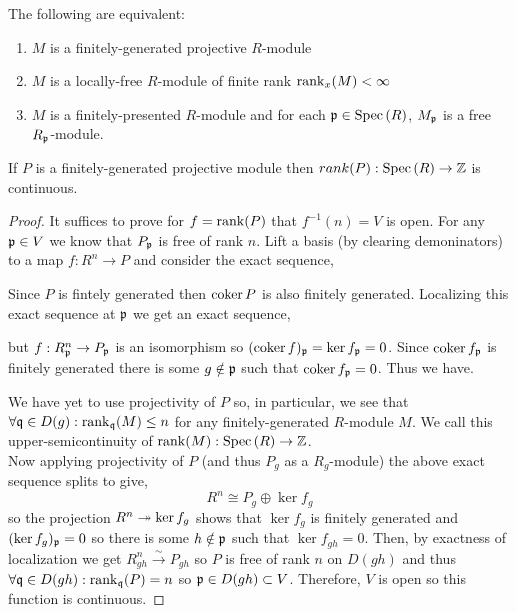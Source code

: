 \documentclass[12pt]{article}
\begin{document}
\begin{theorem}
The following are equivalent:
\begin{enumerate}
\item $M$ is a finitely-generated projective $R$-module
\item $M$ is a locally-free $R$-module of finite rank $\mathrm{rank}_x(M) < \infty$
\item $M$ is a finitely-presented $R$-module and for each $\mathfrak{p} \in \mathrm{Spec}\left( R \right)$, $M_{\mathfrak{p}}$ is a free $R_{\mathfrak{p}}$-module. 
\end{enumerate}
\end{theorem}

\begin{proposition}
If $P$ is a finitely-generated projective module then $rank(P) : \mathrm{Spec}\left( R \right) \to \mathbb{Z}$ is continuous.
\end{proposition}

\begin{proof}
It suffices to prove for $f = \mathrm{rank}(P)$ that $f^{-1}(n) = V$ is open. For any $\mathfrak{p} \in V$ we know that $P_{\mathfrak{p}}$ is free of rank $n$. Lift a basis (by clearing demoninators) to a map $f : R^n \to P$ and consider the exact sequence,
\begin{center}
\end{center}  
Since $P$ is fintely generated then $\operatorname{\mathrm{coker}}{P}$ is also finitely generated. Localizing this exact sequence at $\mathfrak{p}$ we get an exact sequence,
\begin{center}
\end{center}
but $f : R^n_{\mathfrak{p}} \to P_{\mathfrak{p}}$ is an isomorphism so $(\operatorname{\mathrm{coker}}{f})_{\mathfrak{p}} = \ker{f}_{\mathfrak{p}} = 0$. Since $\operatorname{\mathrm{coker}}{f}_{\mathfrak{p}}$ is finitely generated there is some $g \notin \mathfrak{p}$ such that $\operatorname{\mathrm{coker}}{f}_{\mathfrak{p}} = 0$. Thus we have.
\begin{center}
\end{center}
We have yet to use projectivity of $P$ so,
in particular, we see that $\forall \mathfrak{q} \in D(g) : \mathrm{rank}_{\mathfrak{q}}(M) \le n$ for any finitely-generated $R$-module $M$. We call this upper-semicontinuity of $\mathrm{rank}(M) : \mathrm{Spec}\left( R \right) \to \mathbb{Z}$.
\bigskip\\
Now applying projectivity of $P$ (and thus $P_g$ as a $R_g$-module) the above exact sequence splits to give,
\[ R^n \cong P_g \oplus \ker{f}_g \]
so the projection $R^n \twoheadrightarrow \ker{f}_g$ shows that $\ker{f}_g$ is finitely generated and $(\ker{f}_g)_{\mathfrak{p}} = 0$ so there is some $h \notin \mathfrak{p}$ such that $\ker{f}_{gh} = 0$. Then, by exactness of localization we get $R_{gh}^n \xrightarrow{\sim} P_{gh}$ so $P$ is free of rank $n$ on $D(gh)$ and thus $\forall \mathfrak{q} \in D(gh) : \mathrm{rank}_{\mathfrak{q}}(P) = n$ so $\mathfrak{p} \in D(gh) \subset V$. Therefore, $V$ is open so this function is continuous.  
\end{proof}
\end{document}
